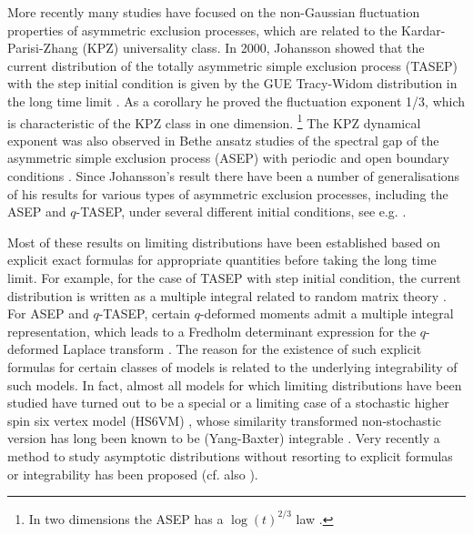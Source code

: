 \documentclass[cmp]{svjour}
\numberwithin{theorem}{section}
\numberwithin{equation}{section}
\begin{document}
More recently many studies have focused on the non-Gaussian fluctuation properties of asymmetric exclusion processes, which are related to the Kardar-Parisi-Zhang (KPZ) universality class\cite{KPZ1986,BS1995}. In 2000, Johansson showed that the current distribution
of the totally asymmetric simple exclusion process (TASEP) with the step initial condition is given by the
GUE Tracy-Widom distribution in the long time limit \cite{J2000}. As a corollary  he proved the fluctuation exponent 1/3, which is characteristic of the KPZ class in one dimension. \footnote{In two dimensions the ASEP has a $\log(t)^{2/3}$ law \cite{Y2004}.} The KPZ dynamical exponent was also observed in Bethe ansatz studies of the spectral gap of the asymmetric simple exclusion process (ASEP) with periodic and open boundary conditions \cite{PhysRevA.46.844, PhysRevLett.68.725, PhysRevE.52.3512, Gier_2005, Gier_2006, Gier_2008}. Since Johansson's result there have been a
number of generalisations of his results for various types of asymmetric exclusion processes, including the
ASEP and $q$-TASEP, under  several different initial conditions, see e.g. \cite{BaikRains00, PS2002, Sasamoto_2005, TW2009a, Sasamoto_2010a,  Sasamoto_2010b, Sasamoto_2010c, Amir_2010, CalabreseDoussal, BC2014}. 

Most of these results on limiting distributions have been established based on explicit exact formulas for appropriate
quantities before taking the long time limit. For example, for the case of TASEP with step initial condition, the current
distribution is written as a multiple integral related to random matrix theory \cite{J2000,NS2004}. For ASEP and $q$-TASEP,
certain $q$-deformed moments admit a multiple integral representation, which leads to a Fredholm determinant
expression for the $q$-deformed Laplace transform \cite{BC2014,bcs}. The reason for the existence of such explicit formulas for certain classes of models is related to the underlying integrability of such models. In fact, almost all models for which limiting distributions have been studied have turned out to be a special or a limiting case of a stochastic higher spin six vertex model (HS6VM)  \cite{MANGAZEEV201470,povolotsky2013,Corwin_2015, BP2016}, whose similarity transformed non-stochastic version has long been known to be (Yang-Baxter) integrable \cite{Kulish1981YangBaxterEA,Kirillov_1987}. Very recently a method to study asymptotic distributions without resorting to explicit formulas or integrability has been 
proposed \cite{QS2020p} (cf. also \cite{Virag2020p}). 
\end{document}
